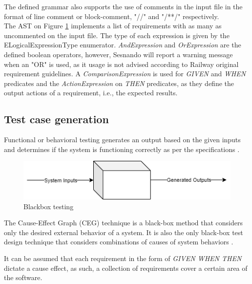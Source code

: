 The defined grammar also supports the use of comments in the input file in the format of line comment or block-comment, "//" and "/**/" respectively.\\
The AST on Figure \ref{fig:ast_class_diagram} implements a list of requirements with as many as uncommented on the input file. The type of each expression is given by the ELogicalExpressionType enumerator. \textit{AndExpression} and \textit{OrExpression} are the defined boolean operators, however, Sesnando will report a warning message when an "OR" is used, as it usage is not advised according to Railway original requirement guidelines. A \textit{ComparisonExpression} is used for \textit{GIVEN} and \textit{WHEN} predicates and the \textit{ActionExpression} on \textit{THEN} predicates, as they define the output actions of a requirement, i.e., the expected results.


\subsection{Test case generation}
\label{subsec:def_test_case_gen}

Functional or behavioral testing generates an output based on the given inputs and determines if the system is functioning correctly as per the specifications \cite{jorgensen_software_2011}.\\

\begin{figure}[H]
    \centering
    \includegraphics[scale=0.65]{images/functional_inputs_outputs.png}
    \caption{Blackbox testing}
    \label{fig:ast_class_diagram}
\end{figure}

The Cause-Effect Graph (CEG) technique is a black-box method that considers only the desired external behavior of a system. It is also the only black-box test design technique that considers combinations of causes of system behaviors \cite{nursimulu_cause-effect_1995}.

It can be assumed that each requirement in the form of \textit{GIVEN WHEN THEN} dictate a cause effect, as such, a collection of requirements cover a certain area of the software.\\


